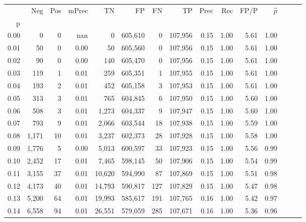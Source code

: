 \begin{tabular}{rrrrrrrrrrrrrrr}
\toprule
{} &     Neg &    Pos & mPrec &       TN &       FP &       FN &       TP &  Prec &   Rec &  FP/P & $\hat{p}$ \\
p    &         &        &       &          &          &          &          &       &       &       &           \\
\midrule
0.00 &       0 &      0 &   nan &        0 &  605,610 &        0 &  107,956 &  0.15 &  1.00 &  5.61 &      1.00 \\
0.01 &      50 &      0 &  0.00 &       50 &  605,560 &        0 &  107,956 &  0.15 &  1.00 &  5.61 &      1.00 \\
0.02 &      90 &      0 &  0.00 &      140 &  605,470 &        0 &  107,956 &  0.15 &  1.00 &  5.61 &      1.00 \\
0.03 &     119 &      1 &  0.01 &      259 &  605,351 &        1 &  107,955 &  0.15 &  1.00 &  5.61 &      1.00 \\
0.04 &     193 &      2 &  0.01 &      452 &  605,158 &        3 &  107,953 &  0.15 &  1.00 &  5.61 &      1.00 \\
0.05 &     313 &      3 &  0.01 &      765 &  604,845 &        6 &  107,950 &  0.15 &  1.00 &  5.60 &      1.00 \\
0.06 &     508 &      3 &  0.01 &    1,273 &  604,337 &        9 &  107,947 &  0.15 &  1.00 &  5.60 &      1.00 \\
0.07 &     793 &      9 &  0.01 &    2,066 &  603,544 &       18 &  107,938 &  0.15 &  1.00 &  5.59 &      1.00 \\
0.08 &   1,171 &     10 &  0.01 &    3,237 &  602,373 &       28 &  107,928 &  0.15 &  1.00 &  5.58 &      1.00 \\
0.09 &   1,776 &      5 &  0.00 &    5,013 &  600,597 &       33 &  107,923 &  0.15 &  1.00 &  5.56 &      0.99 \\
0.10 &   2,452 &     17 &  0.01 &    7,465 &  598,145 &       50 &  107,906 &  0.15 &  1.00 &  5.54 &      0.99 \\
0.11 &   3,155 &     37 &  0.01 &   10,620 &  594,990 &       87 &  107,869 &  0.15 &  1.00 &  5.51 &      0.98 \\
0.12 &   4,173 &     40 &  0.01 &   14,793 &  590,817 &      127 &  107,829 &  0.15 &  1.00 &  5.47 &      0.98 \\
0.13 &   5,200 &     64 &  0.01 &   19,993 &  585,617 &      191 &  107,765 &  0.16 &  1.00 &  5.42 &      0.97 \\
0.14 &   6,558 &     94 &  0.01 &   26,551 &  579,059 &      285 &  107,671 &  0.16 &  1.00 &  5.36 &      0.96 \\

\end{tabular}
